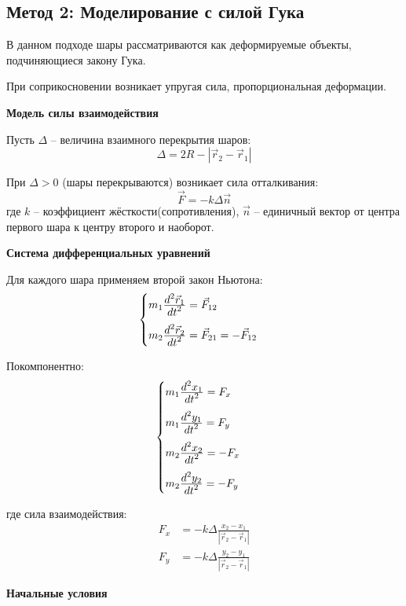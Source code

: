 \begin{center}
    \subsection{Метод 2: Моделирование с силой Гука}
\end{center}

В данном подходе шары рассматриваются как деформируемые объекты, подчиняющиеся закону Гука. 

При соприкосновении возникает упругая сила, пропорциональная деформации.

\begin{center}
    \textbf{Модель силы взаимодействия}
\end{center}

Пусть $\Delta$ -- величина взаимного перекрытия шаров:
\[
\Delta = 2R - |\vec{r}_2 - \vec{r}_1|
\]

При $\Delta > 0$ (шары перекрываются) возникает сила отталкивания:
\[
\vec{F} = -k\Delta \vec{n}
\]
где $k$ -- коэффициент жёсткости(сопротивления), $\vec{n}$ -- единичный вектор от центра первого шара к центру второго и наоборот.

\begin{center}
    \textbf{Система дифференциальных уравнений}
\end{center}

Для каждого шара применяем второй закон Ньютона:
\[
\begin{cases}
m_1 \frac{\displaystyle d^2\vec{r}_1}{\displaystyle dt^2} = \vec{F}_{12} \\[1em]
m_2 \frac{\displaystyle d^2\vec{r}_2}{\displaystyle dt^2} = \vec{F}_{21} = -\vec{F}_{12}
\end{cases}
\]

Покомпонентно:
\[
\begin{cases}
m_1 \frac{\displaystyle d^2x_1}{\displaystyle dt^2} = F_x \\[1em]
m_1 \frac{\displaystyle d^2y_1}{\displaystyle dt^2} = F_y \\[1em]
m_2 \frac{\displaystyle d^2x_2}{\displaystyle dt^2} = -F_x \\[1em]
m_2 \frac{\displaystyle d^2y_2}{\displaystyle dt^2} = -F_y
\end{cases}
\]

где сила взаимодействия:
\[
\begin{aligned}
F_x &= -k\Delta \frac{x_2 - x_1}{|\vec{r}_2 - \vec{r}_1|} \\
F_y &= -k\Delta \frac{y_2 - y_1}{|\vec{r}_2 - \vec{r}_1|}
\end{aligned}
\]

\begin{center}
    \textbf{Начальные условия}
\end{center}

